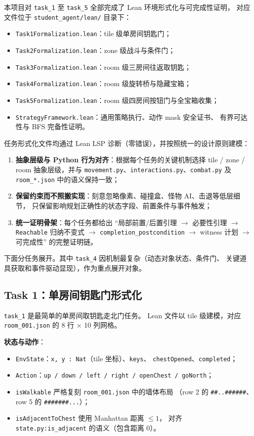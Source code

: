 \documentclass[12pt,a4paper]{ctexart}
\begin{document}
本项目对 \texttt{task\_1} 至 \texttt{task\_5} 全部完成了 Lean 环境形式化与可完成性证明，
对应文件位于 \texttt{student\_agent/lean/} 目录下：
\begin{itemize}[leftmargin=2em]
  \item \texttt{Task1Formalization.lean}：tile 级单房间钥匙门；
  \item \texttt{Task2Formalization.lean}：zone 级战斗与条件门；
  \item \texttt{Task3Formalization.lean}：room 级三房间往返取钥匙；
  \item \texttt{Task4Formalization.lean}：room 级旋转桥与隐藏宝箱；
  \item \texttt{Task5Formalization.lean}：room 级四房间按钮门与全宝箱收集；
  \item \texttt{StrategyFramework.lean}：通用策略执行、动作 mask 安全证书、
  有界可达性与 BFS 完备性证明。
\end{itemize}

任务形式化文件均通过 Lean LSP 诊断（零错误），并按照统一的设计原则建模：
\begin{enumerate}[leftmargin=2em]
  \item \textbf{抽象层级与 Python 行为对齐}：根据每个任务的关键机制选择
  tile / zone / room 抽象层级，并与
  \texttt{movement.py}、\texttt{interactions.py}、\texttt{combat.py}
  及 \texttt{room\_*.json} 中的语义保持一致；
  \item \textbf{保留约束而不照搬实现}：刻意忽略像素、碰撞盒、怪物 AI、击退等低层细节，
  只保留影响规划正确性的状态字段、前置条件与事件触发；
  \item \textbf{统一证明骨架}：每个任务都给出
  “局部前置/后置引理 $\rightarrow$ 必要性引理 $\rightarrow$ \texttt{Reachable} 归纳不变式
  $\rightarrow$ \texttt{completion\_postcondition} $\rightarrow$ witness 计划 $\rightarrow$ 可完成性”
  的完整证明链。
\end{enumerate}

下面分任务展开。其中 \texttt{task\_4} 因机制最复杂（动态对象状态、条件门、
关键道具获取和事件驱动显现），作为重点展开对象。

\subsection{Task 1：单房间钥匙门形式化}

\texttt{task\_1} 是最简单的单房间取钥匙走北门任务。
Lean 文件以 tile 级建模，对应 \texttt{room\_001.json} 的 8 行 $\times$ 10 列网格。

\textbf{状态与动作}：
\begin{itemize}[leftmargin=2em]
  \item \texttt{EnvState}：\texttt{x, y : Nat}（tile 坐标）、\texttt{keys}、
  \texttt{chestOpened}、\texttt{completed}；
  \item \texttt{Action}：\texttt{up / down / left / right / openChest / goNorth}；
  \item \texttt{isWalkable} 严格复刻 \texttt{room\_001.json} 中的墙体布局
  （row 2 的 \texttt{\#\#..\#\#\#\#\#\#}、row 5 的 \texttt{\#\#\#\#\#\#\#...}）；
  \item \texttt{isAdjacentToChest} 使用 Manhattan 距离 $\leq 1$，
  对齐 \texttt{state.py:is\_adjacent} 的语义（包含距离 0）。
\end{itemize}
\end{document}
